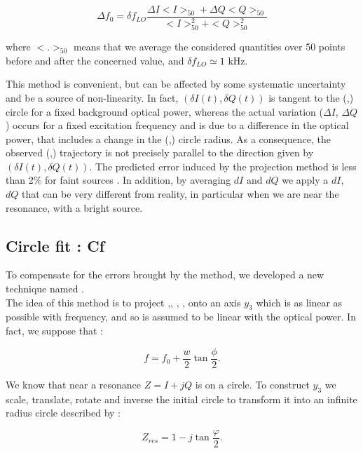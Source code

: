 \begin{equation}
\label{eq:Rf}
\Delta f_{0} = \delta f_{LO} \frac{\Delta I < I >_{50} + \Delta Q < Q >_{50}}{< I >_{50}^{2} + < Q >_{50}^{2}}
\end{equation}


where $<.>_{50}$ means that we average the considered quantities over 50 points before and after the concerned value, and $\delta f_{LO} \simeq 1$ kHz.

This method is convenient, but can be affected by some systematic uncertainty and be a source of non-linearity. In fact, $(\delta I(t), \delta Q(t))$ is tangent to the (\I,\Q) circle for a fixed background optical power, whereas the actual variation ($\Delta I$, $\Delta Q$) occurs for a fixed excitation frequency and is due to a difference in the optical power, that includes a change in the (\I,\Q) circle radius. As a consequence, the observed (\I,\Q) trajectory is not precisely parallel to the direction given by $(\delta I(t), \delta Q(t))$. The predicted error induced by the projection method is less than 2\% for faint sources \citep{2013A&A...551L..12C}. In addition, by averaging $dI$ and $dQ$ we apply a $dI$, $dQ$ that can be very different from reality, in particular when we are near the resonance, with a bright source.\\

\subsection{Circle fit : Cf}
To compensate for the errors brought by the \rf method, we developed a new technique named \cf.\\
The idea of this method is to project \I,\Q, \di, \dq, onto an axis $y_{3}$ which is as linear as possible with frequency, and so is assumed to be linear with the optical power. In fact, we suppose that :

\begin{equation}
\label{hyp-f}
f = f_{0} + \frac{w}{2} \tan \frac{\phi}{2}.
\end{equation}

We know that near a resonance $Z = I+jQ$ is on a circle. To construct $y_{3}$ we scale, translate, rotate and inverse the initial circle to transform it into an infinite radius circle described by :

\begin{equation}
\label{Zres}
Z_{res} = 1 - j \tan \frac{\varphi}{2}.
\end{equation}

